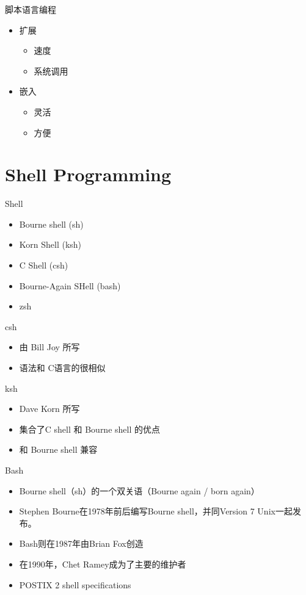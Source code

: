 \begin{frame}{脚本语言编程}
\begin{itemize}
\item 扩展
\begin{itemize}
\item 速度
\item 系统调用
\end{itemize}
\item 嵌入
\begin{itemize}
\item 灵活
\item 方便
\end{itemize}
\end{itemize}
\end{frame}

\section{Shell Programming}
\begin{frame}{Shell}
\begin{itemize}
\item Bourne shell (sh)
\item Korn Shell (ksh)
\item C Shell (csh)
\item Bourne-Again SHell (bash)
\item zsh
\end{itemize}
\end{frame}

\begin{frame}{csh}
\begin{itemize}
\item 由 Bill Joy 所写
\item 语法和 C语言的很相似
\end{itemize}
\end{frame}

\begin{frame}{ksh}
\begin{itemize}
\item Dave Korn 所写
\item 集合了C shell 和 Bourne shell 的优点
\item 和 Bourne shell 兼容
\end{itemize}
\end{frame}

\begin{frame}{Bash}
\begin{itemize}
\item Bourne shell（sh）的一个双关语（Bourne again / born again）
\item Stephen Bourne在1978年前后编写Bourne shell，并同Version 7 Unix一起发布。
\item Bash则在1987年由Brian Fox创造
\item 在1990年，Chet Ramey成为了主要的维护者
\item POSTIX 2 shell specifications
\end{itemize}
\end{frame}

